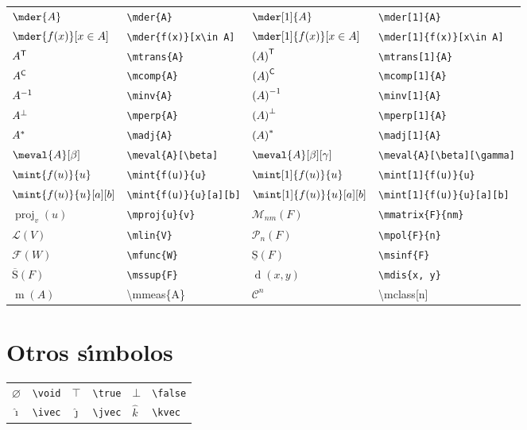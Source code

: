 \documentclass[10pt, a4paper]{article}
\newcommand{\ds}{\displaystyle}
\newcommand{\mtrans}[2][0]{
	\ifthenelse{ \equal{#1}{0} }{{#2}^{\mathsf{T}}}{\left( #2 \right)^{\mathsf{T}}}
}
\newcommand{\mcomp}[2][0]{
	\ifthenelse{ \equal{#1}{0} }{{#2}^{\mathsf{C}}}{\left( #2 \right)^{\mathsf{C}}}
}
\newcommand{\minv}[2][0]{
	\ifthenelse{ \equal{#1}{0} }{{#2}^{-1}}{\left( #2 \right)^{-1}}
}
\newcommand{\mperp}[2][0]{
	\ifthenelse{ \equal{#1}{0} }{{#2}^{\perp}}{\left( #2 \right)^{\perp}}
}
\newcommand{\madj}[2][0]{
	\ifthenelse{ \equal{#1}{0} }{{#2}^{*}}{\left( #2 \right)^{*}}
}
\newcommand{\mproj}[2]{\operatorname{proj}_{#2}\left(#1\right)}
\newcommand{\mpol}[2]{\mathcal{P}_{#2}\left( #1 \right)}
\newcommand{\mmatrix}[2]{\mathcal{M}_{#2}\left( #1 \right)}
\newcommand{\mlin}[1]{\mathcal{L}\left( #1 \right)}
\newcommand{\mfunc}[1]{\mathcal{F}\left( #1 \right)}
\newcommand{\mdis}[1]{\operatorname{d}\left( #1 \right)}
\newcommand{\msinf}[1]{\operatorname{\underline{S}}\left( #1 \right)}
\newcommand{\mssup}[1]{\operatorname{\overline{S}}\left( #1 \right)}
\newcommand{\mmeas}[1]{\operatorname{m}\left( #1 \right)}
\newcommand{\mclass}[1][]{\mathcal{C}^{#1}}
\newcommand{\void}{\varnothing}
\newcommand{\true}{\top}
\newcommand{\false}{\bot}
\newcommand{\ivec}{\hat{\imath}}
\newcommand{\jvec}{\hat{\jmath}}
\newcommand{\kvec}{\hat{k}}
\begin{document}
\begin{center}
\begin{tabular}{ll|ll}
		$ \mder{A} $ & \texttt{\textbackslash mder\{A\}} & $ \mder[1]{A} $ & \texttt{\textbackslash mder[1]\{A\}}\\
		$ \ds\mder{f(x)}[x\in A] $ & \texttt{\textbackslash mder\{f(x)\}[x\textbackslash in A]} & $ \ds\mder[1]{f(x)}[x\in A] $ & \texttt{\textbackslash mder[1]\{f(x)\}[x\textbackslash in A]}\\
		$ \mtrans{A} $ & \texttt{\textbackslash mtrans\{A\}} & $ \mtrans[1]{A} $ & \texttt{\textbackslash mtrans[1]\{A\}}\\
		$ \mcomp{A} $ & \texttt{\textbackslash mcomp\{A\}} & $ \mcomp[1]{A} $ & \texttt{\textbackslash mcomp[1]\{A\}}\\
		$ \minv{A} $ & \texttt{\textbackslash minv\{A\}} & $ \minv[1]{A} $ & \texttt{\textbackslash minv[1]\{A\}}\\
		$ \mperp{A} $ & \texttt{\textbackslash mperp\{A\}} & $ \mperp[1]{A} $ & \texttt{\textbackslash mperp[1]\{A\}}\\
		$ \madj{A} $ & \texttt{\textbackslash madj\{A\}} & $ \madj[1]{A} $ & \texttt{\textbackslash madj[1]\{A\}}\\
		$ \meval{A}[\beta] $ & \texttt{\textbackslash meval\{A\}[\textbackslash beta]} & $ \meval{A}[\beta][\gamma] $ & \texttt{\textbackslash meval\{A\}[\textbackslash beta][\textbackslash gamma]}\\
		$ \ds\mint{f(u)}{u} $ & \texttt{\textbackslash mint\{f(u)\}\{u\}} & $ \ds\mint[1]{f(u)}{u} $ & \texttt{\textbackslash mint[1]\{f(u)\}\{u\}}\\
		$ \ds\mint{f(u)}{u}[a][b] $ & \texttt{\textbackslash mint\{f(u)\}\{u\}[a][b]} & $ \ds\mint[1]{f(u)}{u}[a][b] $ & \texttt{\textbackslash mint[1]\{f(u)\}\{u\}[a][b]}\\
		$ \mproj{u}{v} $ & \texttt{\textbackslash mproj\{u\}\{v\}} & $ \mmatrix{F}{nm} $ & \texttt{\textbackslash mmatrix\{F\}\{nm\}}\\
		$ \mlin{V} $ & \texttt{\textbackslash mlin\{V\}} & $ \mpol{F}{n} $ & \texttt{\textbackslash mpol\{F\}\{n\}}\\
		$ \mfunc{W} $ & \texttt{\textbackslash mfunc\{W\}} & $ \msinf{F} $ & \texttt{\textbackslash msinf\{F\}}\\
		$ \mssup{F} $ & \texttt{\textbackslash mssup\{F\}} & $ \mdis{x, y} $ & \texttt{\textbackslash mdis\{x, y\}}\\
		$\mmeas{A}$ & \textbackslash mmeas\{A\} & $\mclass[n]$ & \textbackslash mclass[n]
	\end{tabular}
\end{center}
\section{Otros s\'{\i}mbolos}
\begin{center}
	\begin{tabular}{ll|ll|ll}
		$ \void $ & \texttt{\textbackslash void} & $ \true $ & \texttt{\textbackslash true} & $ \false $ & \texttt{\textbackslash false}\\
		$ \ivec $ & \texttt{\textbackslash ivec} & $ \jvec $ & \texttt{\textbackslash jvec} & $ \kvec $ & \texttt{\textbackslash kvec}
	\end{tabular}
\end{center}
\end{document}
